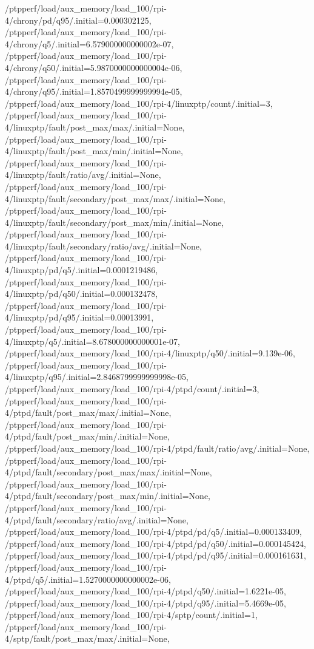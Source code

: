 {    /ptpperf/load/aux_memory/load_100/rpi-4/chrony/pd/q95/.initial=0.000302125,
    /ptpperf/load/aux_memory/load_100/rpi-4/chrony/q5/.initial=6.579000000000002e-07,
    /ptpperf/load/aux_memory/load_100/rpi-4/chrony/q50/.initial=5.9870000000000004e-06,
    /ptpperf/load/aux_memory/load_100/rpi-4/chrony/q95/.initial=1.8570499999999994e-05,
    /ptpperf/load/aux_memory/load_100/rpi-4/linuxptp/count/.initial=3,
    /ptpperf/load/aux_memory/load_100/rpi-4/linuxptp/fault/post_max/max/.initial=None,
    /ptpperf/load/aux_memory/load_100/rpi-4/linuxptp/fault/post_max/min/.initial=None,
    /ptpperf/load/aux_memory/load_100/rpi-4/linuxptp/fault/ratio/avg/.initial=None,
    /ptpperf/load/aux_memory/load_100/rpi-4/linuxptp/fault/secondary/post_max/max/.initial=None,
    /ptpperf/load/aux_memory/load_100/rpi-4/linuxptp/fault/secondary/post_max/min/.initial=None,
    /ptpperf/load/aux_memory/load_100/rpi-4/linuxptp/fault/secondary/ratio/avg/.initial=None,
    /ptpperf/load/aux_memory/load_100/rpi-4/linuxptp/pd/q5/.initial=0.0001219486,
    /ptpperf/load/aux_memory/load_100/rpi-4/linuxptp/pd/q50/.initial=0.000132478,
    /ptpperf/load/aux_memory/load_100/rpi-4/linuxptp/pd/q95/.initial=0.00013991,
    /ptpperf/load/aux_memory/load_100/rpi-4/linuxptp/q5/.initial=8.678000000000001e-07,
    /ptpperf/load/aux_memory/load_100/rpi-4/linuxptp/q50/.initial=9.139e-06,
    /ptpperf/load/aux_memory/load_100/rpi-4/linuxptp/q95/.initial=2.8468799999999998e-05,
    /ptpperf/load/aux_memory/load_100/rpi-4/ptpd/count/.initial=3,
    /ptpperf/load/aux_memory/load_100/rpi-4/ptpd/fault/post_max/max/.initial=None,
    /ptpperf/load/aux_memory/load_100/rpi-4/ptpd/fault/post_max/min/.initial=None,
    /ptpperf/load/aux_memory/load_100/rpi-4/ptpd/fault/ratio/avg/.initial=None,
    /ptpperf/load/aux_memory/load_100/rpi-4/ptpd/fault/secondary/post_max/max/.initial=None,
    /ptpperf/load/aux_memory/load_100/rpi-4/ptpd/fault/secondary/post_max/min/.initial=None,
    /ptpperf/load/aux_memory/load_100/rpi-4/ptpd/fault/secondary/ratio/avg/.initial=None,
    /ptpperf/load/aux_memory/load_100/rpi-4/ptpd/pd/q5/.initial=0.000133409,
    /ptpperf/load/aux_memory/load_100/rpi-4/ptpd/pd/q50/.initial=0.000145424,
    /ptpperf/load/aux_memory/load_100/rpi-4/ptpd/pd/q95/.initial=0.000161631,
    /ptpperf/load/aux_memory/load_100/rpi-4/ptpd/q5/.initial=1.5270000000000002e-06,
    /ptpperf/load/aux_memory/load_100/rpi-4/ptpd/q50/.initial=1.6221e-05,
    /ptpperf/load/aux_memory/load_100/rpi-4/ptpd/q95/.initial=5.4669e-05,
    /ptpperf/load/aux_memory/load_100/rpi-4/sptp/count/.initial=1,
    /ptpperf/load/aux_memory/load_100/rpi-4/sptp/fault/post_max/max/.initial=None,
}
